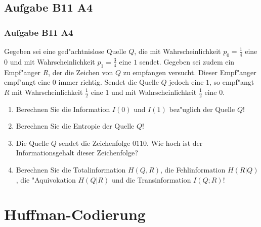 \subsection{Aufgabe B11 A4}
\begin{frame}
	\frametitle{Aufgabe B11 A4}
	Gegeben sei eine ged"achtnislose Quelle $Q$, die mit Wahrscheinlichkeit $p_0 =
	\frac{1}{4}$ eine $0$ und mit Wahrscheinlichkeit $p_1 = \frac{3}{4}$ eine $1$ sendet.
	Gegeben sei zudem ein Empf"anger $R$, der die Zeichen von $Q$ zu empfangen versucht.
	Dieser Empf"anger empf"angt eine $0$ immer richtig. Sendet die Quelle $Q$ jedoch
	eine $1$, so empf"angt $R$ mit Wahrscheinlichkeit $\frac{1}{2}$ eine $1$ und mit
	Wahrscheinlichkeit $\frac{1}{2}$ eine $0$.
	\begin{enumerate}
		\item Berechnen Sie die Information $I(0)$ und $I(1)$ bez"uglich der Quelle $Q$!
		\item Berechnen Sie die Entropie der Quelle $Q$!
		\item Die Quelle $Q$ sendet die Zeichenfolge $0110$. Wie hoch ist der
		Informationsgehalt dieser Zeichenfolge?
		\item Berechnen Sie die Totalinformation $H(Q,R)$, die Fehlinformation $H(R|Q)$,
		die "Aquivokation $H(Q|R)$ und die Transinformation $I(Q;R)$!
	\end{enumerate}
\end{frame}

\section{Huffman-Codierung}
